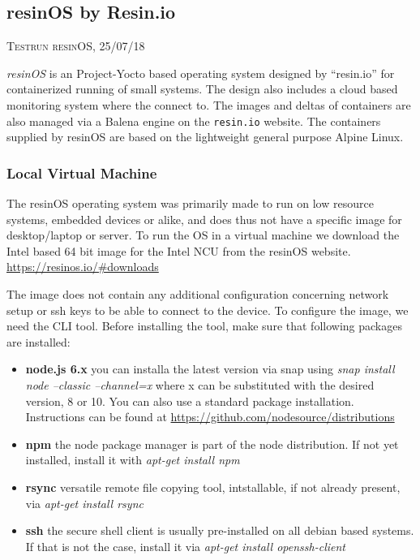 \documentclass[]{scrartcl}
\begin{document}
\subsection{resinOS by Resin.io}

{\small\textsc{Testrun resinOS, 25/07/18} \bigskip}

\textit{resinOS} is an Project-Yocto based operating system designed by ``resin.io'' for containerized running of small systems. The design also includes a cloud based monitoring system where the connect to. The images and deltas of containers are also managed via a Balena engine on the \texttt{resin.io} website. The containers supplied by resinOS are based on the lightweight general purpose Alpine Linux.




\subsubsection{Local Virtual Machine}

The resinOS operating system was primarily made to run on low resource systems, embedded devices or alike, and does thus not have a specific image for desktop/laptop or server. To run the OS in a virtual machine we download the Intel based 64 bit image for the Intel NCU from the resinOS website. \url{https://resinos.io/#downloads}

The image does not contain any additional configuration concerning network setup or ssh keys to be able to connect to the device. To configure the image, we need the CLI tool. Before installing the tool, make sure that following packages are installed:

\begin{itemize}
	
	\item \textbf{node.js 6.x} you can installa the latest version via snap using \textit{snap install node --classic --channel=x} where x can be substituted with the desired version, 8 or 10. You can also use a standard package installation. Instructions can be found at \url{https://github.com/nodesource/distributions}
	\item \textbf{npm} the node package manager is part of the node distribution. If not yet installed, install it with \textit{apt-get install npm}
	\item \textbf{rsync} versatile remote file copying tool, intstallable, if not already present, via \textit{apt-get install rsync}
	\item \textbf{ssh} the secure shell client is usually pre-installed on all debian based systems. If that is not the case, install it via \textit{apt-get install openssh-client}
	
\end{itemize}
\end{document}

